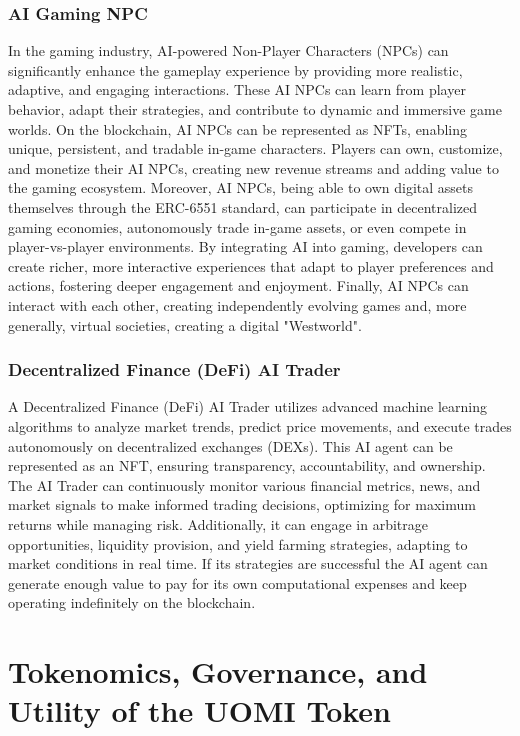 \documentclass{article}
\begin{document}
\subsubsection{AI Gaming NPC}


In the gaming industry, AI-powered Non-Player Characters (NPCs) can significantly enhance the gameplay experience by providing more realistic, adaptive, and engaging interactions. These AI NPCs can learn from player behavior, adapt their strategies, and contribute to dynamic and immersive game worlds. On the blockchain, AI NPCs can be represented as NFTs, enabling unique, persistent, and tradable in-game characters. Players can own, customize, and monetize their AI NPCs, creating new revenue streams and adding value to the gaming ecosystem. Moreover, AI NPCs, being able to own digital assets themselves through the ERC-6551 standard, can participate in decentralized gaming economies, autonomously trade in-game assets, or even compete in player-vs-player environments. By integrating AI into gaming, developers can create richer, more interactive experiences that adapt to player preferences and actions, fostering deeper engagement and enjoyment. Finally, AI NPCs can interact with each other, creating independently evolving games and, more generally, virtual societies, creating a digital "Westworld".

\subsubsection{Decentralized Finance (DeFi) AI Trader}


A Decentralized Finance (DeFi) AI Trader utilizes advanced machine learning algorithms to analyze market trends, predict price movements, and execute trades autonomously on decentralized exchanges (DEXs). This AI agent can be represented as an NFT, ensuring transparency, accountability, and ownership. The AI Trader can continuously monitor various financial metrics, news, and market signals to make informed trading decisions, optimizing for maximum returns while managing risk. Additionally, it can engage in arbitrage opportunities, liquidity provision, and yield farming strategies, adapting to market conditions in real time. If its strategies are successful the AI agent can generate enough value to pay for its own computational expenses and keep operating indefinitely on the blockchain.




\section{Tokenomics, Governance, and Utility of the UOMI Token}
\end{document}
